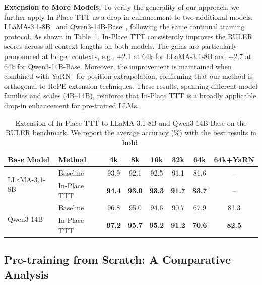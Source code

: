 \textbf{Extension to More Models.}
To verify the generality of our approach, we further apply In-Place TTT as a drop-in enhancement to two additional models: LLaMA-3.1-8B~\citep{grattafiori2024llama} and Qwen3-14B-Base~\citep{yang2025qwen3}, following the same continual training protocol. As shown in Table~\ref{tab:extension}, In-Place TTT consistently improves the RULER scores across all context lengths on both models. The gains are particularly pronounced at longer contexts, e.g., +2.1 at 64k for LLaMA-3.1-8B and +2.7 at 64k for Qwen3-14B-Base. Moreover, the improvement is maintained when combined with YaRN~\citep{peng2023yarn} for position extrapolation, confirming that our method is orthogonal to RoPE extension techniques. These results, spanning different model families and scales (4B--14B), reinforce that In-Place TTT is a broadly applicable drop-in enhancement for pre-trained LLMs.

\begin{table}[t]
\centering
\caption{Extension of In-Place TTT to LLaMA-3.1-8B and Qwen3-14B-Base on the RULER benchmark. We report the average accuracy (\%) with the best results in \textbf{bold}.}
\label{tab:extension}
\vspace{2mm}
\small
\begin{tabular}{llcccccc}
\toprule
Base Model & Method & 4k & 8k & 16k & 32k & 64k & 64k+YaRN \\
\midrule
\multirow{2}{*}{LLaMA-3.1-8B}
 & Baseline       & 93.9 & 92.1 & 92.5 & 91.1 & 81.6 & -- \\
 & In-Place TTT   & \textbf{94.4} & \textbf{93.0} & \textbf{93.3} & \textbf{91.7} & \textbf{83.7} & -- \\
\midrule
\multirow{2}{*}{Qwen3-14B}
 & Baseline       & 96.8 & 95.0 & 94.6 & 90.7 & 67.9 & 81.3 \\
 & In-Place TTT   & \textbf{97.2} & \textbf{95.7} & \textbf{95.2} & \textbf{91.2} & \textbf{70.6} & \textbf{82.5} \\
\bottomrule
\end{tabular}
\end{table}

\subsection{Pre-training from Scratch: A Comparative Analysis}
\label{sec:exp_from_scratch}

